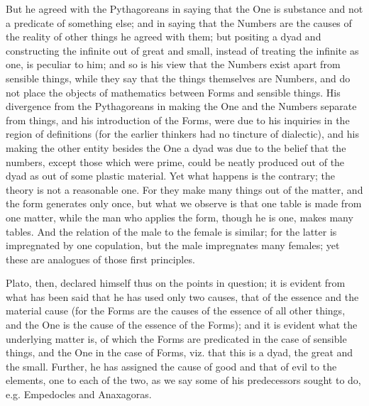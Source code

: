 \documentclass{article}
\begin{document}
But he agreed with the Pythagoreans in saying that the One is substance and not a predicate of something else; and in saying that the Numbers are the causes of the reality of other things he agreed with them; but positing a dyad and constructing the infinite out of great and small, instead of treating the infinite as one, is peculiar to him; and so is his view that the Numbers exist apart from sensible things, while they say that the things themselves are Numbers, and do not place the objects of mathematics between Forms and sensible things. His divergence from the Pythagoreans in making the One and the Numbers separate from things, and his introduction of the Forms, were due to his inquiries in the region of definitions (for the earlier thinkers had no tincture of dialectic), and his making the other entity besides the One a dyad was due to the belief that the numbers, except those which were prime, could be neatly produced out of the dyad as out of some plastic material. Yet what happens is the contrary; the theory is not a reasonable one. For they make many things out of the matter, and the form generates only once, but what we observe is that one table is made from one matter, while the man who applies the form, though he is one, makes many tables. And the relation of the male to the female is similar; for the latter is impregnated by one copulation, but the male impregnates many females; yet these are analogues of those first principles.

Plato, then, declared himself thus on the points in question; it is evident from what has been said that he has used only two causes, that of the essence and the material cause (for the Forms are the causes of the essence of all other things, and the One is the cause of the essence of the Forms); and it is evident what the underlying matter is, of which the Forms are predicated in the case of sensible things, and the One in the case of Forms, viz. that this is a dyad, the great and the small. Further, he has assigned the cause of good and that of evil to the elements, one to each of the two, as we say some of his predecessors sought to do, e.g. Empedocles and Anaxagoras.
\end{document}
